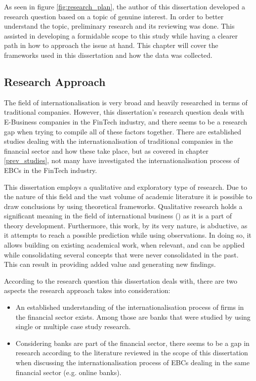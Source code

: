 \documentclass[11pt,a4paper]{article}
\begin{document}
{{As seen in figure \ref{fig:research_plan}, the author of this dissertation developed a research question based on a topic of genuine interest. In order to better understand the topic, preliminary research and its reviewing was done. This assisted in developing a formidable scope to this study while having a clearer path in how to approach the issue at hand. This chapter will cover the frameworks used in this dissertation and how the data was collected.


\subsection{Research Approach} %
The field of internationalisation is very broad and heavily researched in terms of traditional companies. However, this dissertation's research question deals with E-Business companies in the FinTech industry, and there seems to be a research gap when trying to compile all of these factors together. There are established studies dealing with the internationalisation of traditional companies in the financial sector and how these take place, but as covered in chapter \ref{prev_studies}, not many have investigated the internationalisation process of EBCs in the FinTech industry. \par
This dissertation employs a qualitative and exploratory type of research. Due to the nature of this field and the vast volume of academic literature it is possible to draw conclusions by using theoretical frameworks. Qualitative research holds a significant meaning in the field of international business (\cite{dozQualitativeResearchInternational2011}) as it is a part of theory development. Furthermore, this work, by its very nature, is abductive, as it attempts to reach a possible prediction while using observations. In doing so, it allows building on existing academical work, when relevant, and can be applied while consolidating several concepts that were never consolidated in the past. This can result in providing added value and generating new findings. \par %
According to the research question this dissertation deals with, there are two aspects the research approach takes into consideration:
\begin{itemize}
 \item {An established understanding of the internationalisation process of firms in the financial sector exists. Among those are banks that were studied by using single or multiple case study research.}
 \item{Considering banks are part of the financial sector, there seems to be a gap in research according to the literature reviewed in the scope of this dissertation when discussing the internationalisation process of EBCs dealing in the same financial sector (e.g. online banks). }
\end{itemize}


}}
\end{document}
